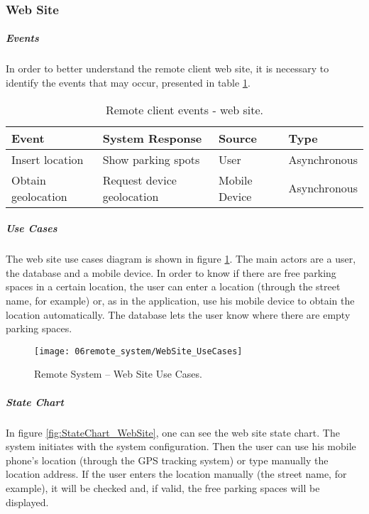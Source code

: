 \subsubsection*{Web Site}
\subparagraph*{Events}
In order to better understand the remote client web site, it is necessary to identify the events that may occur, presented in table \ref{table:rc_web_events}.

\begin{table}[ht]
	\centering
	\resizebox{\columnwidth}{!}
	{
		\begin{tabular}{|m{3cm}|m{5cm}|m{2.4cm}|m{2.4cm}|}
			\hline
			\textbf{Event} & \textbf{System Response} & \textbf{Source} & \textbf{Type}\\
			\hline\hline
			Insert location	& Show parking spots & User & Asynchronous\\
			\hline
			
			Obtain geolocation & Request device geolocation & Mobile Device & Asynchronous\\
			\hline
			
		\end{tabular}
	}
	\caption{Remote client events - web site.}
	\label{table:rc_web_events}
\end{table}

\subparagraph*{Use Cases}
The web site use cases diagram is shown in figure \ref{fig:UseCases_WebSite}. The main actors are a user, the database and a mobile device. In order to know if there are free parking spaces in a certain location, the user can enter a location (through the street name, for example) or, as in the application, use his mobile device to obtain the location automatically. The database lets the user know where there are empty parking spaces.

\begin{figure}[H]
	\centering
	\texttt{[image: 06remote\_system/WebSite\_UseCases]}
	\caption{Remote System – Web Site Use Cases.}
	\label{fig:UseCases_WebSite}
\end{figure}

\clearpage
\subparagraph*{State Chart}
In figure \ref{fig:StateChart_WebSite}, one can see the web site state chart. The system initiates with the system configuration. Then the user can use his mobile phone's location (through the GPS tracking system) or type manually the location address. If the user enters the location manually (the street name, for example), it will be checked and, if valid, the free parking spaces will be displayed.

